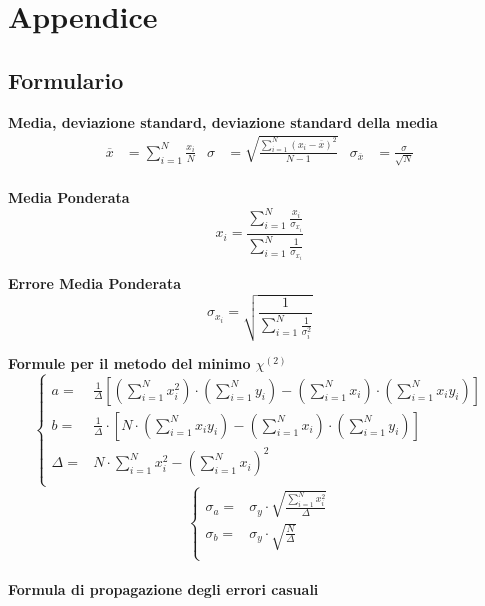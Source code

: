 \documentclass[a4paper,11pt,oneside]{article}
\begin{document}





%

\newpage
\section{Appendice}
\subsection{Formulario}
\textbf{Media, deviazione standard, deviazione standard della media}
\begin{align*}
        \overline{x}&=\sum\limits_{i=1}^{N} \frac{x_{i}}{N}&
        \sigma&=\sqrt{\frac{\sum\limits_{i=1}^{N} (x_{i}-\overline{x})^2}{N-1}}&
        \sigma_{\overline{x}}&=\frac{\sigma}{\sqrt{N}}
\end{align*}\\

\textbf{Media Ponderata}
\begin{equation*}
\label{eq:media_pond}
    x_i=\frac{\sum_{i=1}^{N}\frac{x_i}{\sigma_{x_i}}}{\sum_{i=1}^{N}\frac{1}{\sigma_{x_i}}}
\end{equation*}

\textbf{Errore Media Ponderata}
\begin{equation*}
\label{eq:errore_media_pond}
     \sigma_{x_i}=\sqrt{\frac{1}{\sum_{i=1}^{N}\frac{1}{\sigma_{i}^{2}}}}
\end{equation*}

\textbf{Formule per il metodo del minimo ${\chi}^{(2)}$}
\begin{equation*}
        \begin{cases}
    a=&\frac{1}{\Delta}[(\sum\limits_{i=1}^{N}{x_{i}^{2}})\cdot(\sum\limits_{i=1}^{N}{y_{i}})-(\sum\limits_{i=1}^{N}{x_{i}})\cdot(\sum\limits_{i=1}^{N}{x_{i}y_{i}})] \\ 
    b=&\frac{1}{\Delta }\cdot \left [N\cdot \left ( \sum\limits_{i=1}^{N}x_i y_i \right )-\left ( \sum\limits_{i=1}^{N}x_i \right )\cdot \left ( \sum\limits_{i=1}^{N}y_i \right )  \right ]\\
    \Delta=& N\cdot \sum\limits_{i=1}^{N} x_i^{2} - \left ( \sum\limits_{i=1}^{N}x_i \right )^{2}\\
    \end{cases}
\end{equation*}
\begin{equation*}
    \begin{cases}
    \sigma_{a}=&\sigma_{y}\cdot\sqrt{\frac{\sum_{i=1}^{N}{x_{i}^{2}}}{\Delta}} \\
    \sigma_{b}=&\sigma_y\cdot \sqrt{\frac{N}{\Delta }}\\
    \end{cases}
    \label{equation:err_chi_quadro}
\end{equation*}
\\
\textbf{Formula di propagazione degli errori casuali}\\
\end{document}
